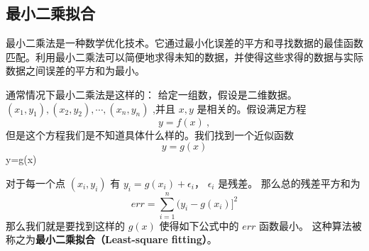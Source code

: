 

\subsection{最小二乘拟合}
最小二乘法是一种数学优化技术。它通过最小化误差的平方和寻找数据的最佳函数匹配。利用最小二乘法可以简便地求得未知的数据，并使得这些求得的数据与实际数据之间误差的平方和为最小。

通常情况下最小二乘法是这样的： 给定一组数，假设是二维数据。$(x_1,y_1),(x_2,y_2),\cdots,(x_n,y_n)$ ,并且 $x,y$ 是相关的。假设满足方程
\begin{equation}
y=f(x)~,
\end{equation}
但是这个方程我们是不知道具体什么样的。我们找到一个近似函数
\begin{equation}
y=g(x)
\end{equation}
y=g(x)

对于每一个点 $(x_i,y_i)$ 有 $y_i=g(x_i)+\epsilon_i$， $\epsilon_i$ 是残差。 那么总的残差平方和为
\begin{equation}
err=\sum_{i=1}^n(y_i-g(x_i)]^2
\end{equation}
那么我们就是要找到这样的 $g(x)$ 使得如下公式中的 $err$ 函数最小。 这种算法被称之为\textbf{最小二乘拟合（Least-square fitting）}。

